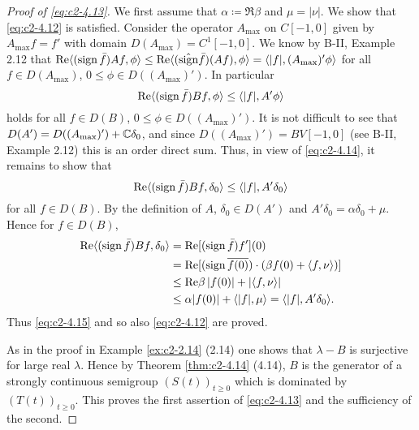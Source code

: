 \begin{proof}[Proof of \eqref{eq:c2-4.13}]
We first assume that $\alpha \coloneqq \Re  \beta$ and $\mu = |\nu|$.
We show that \eqref{eq:c2-4.12} is satisfied.
Consider the operator $A_{\max}$ on $C[-1,0]$ given by $A_{\max}f = f'$ with domain $D(A_{\max}) = C^{1}[-1,0]$.
We know by B-II, Example 2.12 
that $\mathop{}\!\mathrm{Re}\langle(\operatorname{sign}  \bar{f})Af,\phi\rangle \leq \mathop{}\!\mathrm{Re}\langle(\hat{\operatorname{sign}}  \bar{f})(Af),\phi\rangle = \langle|f|, (A_{\max})'\phi\rangle$ for all $f \in D(A_{\max})$, $0 \leq \phi \in D((A_{\max})')$.
In particular
\begin{equation}\label{eq:c2-4.14}
\mathop{}\!\mathrm{Re}\langle(\operatorname{sign}  \bar{f})Bf,\phi\rangle \leq \langle|f|,A'\phi\rangle
\end{equation}
holds for all $f \in D(B)$, $0 \leq \phi \in D((A_{\max})')$.
It is not difficult to see that $D(A') = D((A_{\max})') + \mathbb{C}\delta_{0}$, and since $D((A_{\max})') = BV[-1,0]$
(see B-II, Example 2.12)
this is an order direct sum.
Thus, in view of \eqref{eq:c2-4.14}, it remains to show that
\begin{equation}\label{eq:c2-4.15}
\mathop{}\!\mathrm{Re}\langle(\operatorname{sign}  \bar{f})Bf,\delta_{0}\rangle \leq \langle|f|,A'\delta_{0}\rangle
\end{equation}
for all $f \in D(B)$.
By the definition of $A$, $\delta_{0} \in D(A')$ and $A'\delta_{0} =  \alpha\delta_{0} + \mu$.
Hence for $f \in D(B)$,
\begin{align*}
\mathop{}\!\mathrm{Re}\langle(\operatorname{sign} \bar{f})Bf,\delta_{0}\rangle &= \mathop{}\!\mathrm{Re}[(\operatorname{sign} \bar{f})f'](0) \\
&= \mathop{}\!\mathrm{Re}[(\operatorname{sign}  \overline{f(0)})\cdot(\beta f(0) +  \langle f,\nu\rangle)] \\
&\leq \mathop{}\!\mathrm{Re}\beta \, |f(0)| + |\langle f,\nu\rangle| \\
&\leq \alpha|f(0)| + \langle|f|,\mu\rangle = \langle|f|,A'\delta_{0}\rangle.
\end{align*}
Thus \eqref{eq:c2-4.15} and so also \eqref{eq:c2-4.12} are proved.

As in the proof in Example \ref{ex:c2-2.14} (2.14) one shows that $\lambda - B$ is surjective for large real $\lambda$.
Hence by Theorem \ref{thm:c2-4.14} (4.14), $B$ is the generator of a
strongly continuous semigroup $(S(t))_{t \geq 0}$ which is dominated by
$(T(t))_{t \geq 0}$.
This proves the first assertion of \eqref{eq:c2-4.13} and the sufficiency of the second.


\end{proof}
